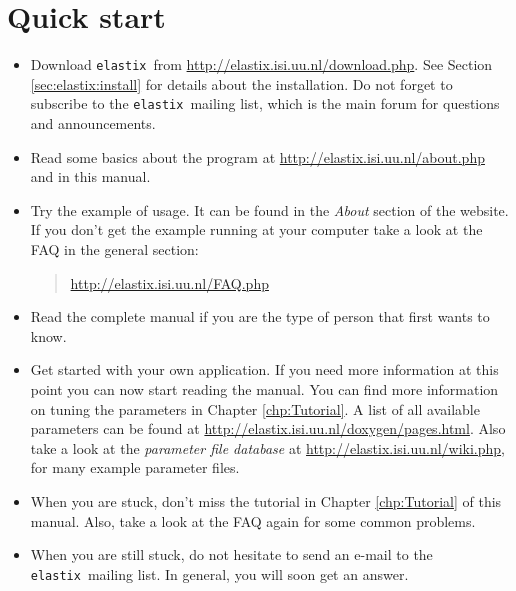 \documentclass[]{report}
\newcommand{\elastix}{\texttt{elastix}}
\begin{document}

\section{Quick start}

\begin{itemize}
\item Download \elastix\ from \url{http://elastix.isi.uu.nl/download.php}.
    See Section \ref{sec:elastix:install} for details about the
    installation. Do not forget to subscribe to the \elastix\ mailing list,
    which is the main forum for questions and announcements.

\item Read some basics about the program at
    \url{http://elastix.isi.uu.nl/about.php} and in this manual.

\item Try the example of usage. It can be found in the \emph{About}
section of the website. If you don't get the example running at your
computer take a look at the FAQ in the general section:
\begin{quote}
\url{http://elastix.isi.uu.nl/FAQ.php}
\end{quote}

\item Read the complete manual if you are the type of person that
first wants to know.

\item Get started with your own application. If you need more information
    at this point you can now start reading the manual. You can find more
    information on tuning the parameters in Chapter \ref{chp:Tutorial}. A
    list of all available parameters can be found at
    \url{http://elastix.isi.uu.nl/doxygen/pages.html}. Also take a look at
    the \emph{parameter file database} at
    \url{http://elastix.isi.uu.nl/wiki.php}, for many example parameter
    files.

\item When you are stuck, don't miss the tutorial in Chapter
\ref{chp:Tutorial} of this manual. Also, take a look at the FAQ again
for some common problems.

\item When you are still stuck, do not hesitate to send an e-mail to the
    \elastix\ mailing list. In general, you will soon get an answer.
\end{itemize}
\end{document}
